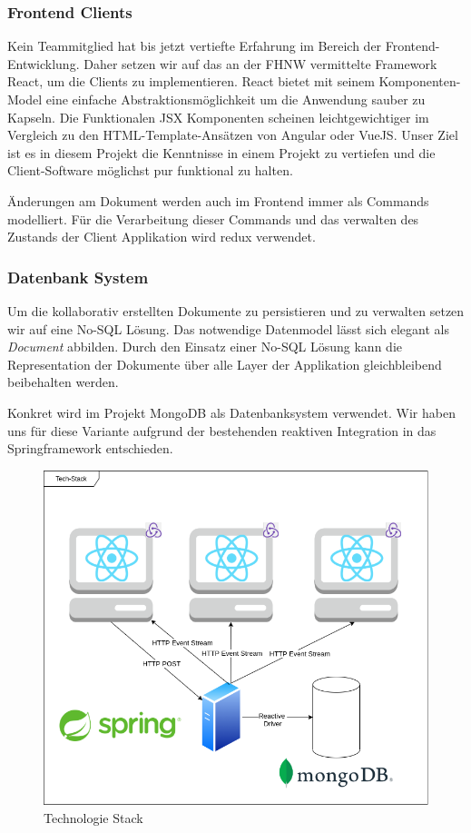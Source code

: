 \subsubsection{Frontend Clients}
Kein Teammitglied hat bis jetzt vertiefte Erfahrung im Bereich der Frontend-Entwicklung.
Daher setzen wir auf das an der FHNW vermittelte Framework React, um die Clients zu implementieren.
React bietet mit seinem Komponenten-Model eine einfache Abstraktionsmöglichkeit um die Anwendung sauber zu Kapseln.
Die Funktionalen JSX Komponenten scheinen leichtgewichtiger im Vergleich zu den HTML-Template-Ansätzen von Angular oder VueJS\@.
Unser Ziel ist es in diesem Projekt die Kenntnisse in einem Projekt zu vertiefen und die Client-Software möglichst pur funktional zu halten.

Änderungen am Dokument werden auch im Frontend immer als Commands modelliert.
Für die Verarbeitung dieser Commands und das verwalten des Zustands der Client Applikation wird redux verwendet.

\subsubsection{Datenbank System}
Um die kollaborativ erstellten Dokumente zu persistieren und zu verwalten setzen wir auf eine No-SQL Lösung.
Das notwendige Datenmodel lässt sich elegant als \emph{Document} abbilden.
Durch den Einsatz einer No-SQL Lösung kann die Representation der Dokumente über alle Layer der Applikation gleichbleibend beibehalten werden\@.

Konkret wird im Projekt MongoDB als Datenbanksystem verwendet.
Wir haben uns für diese Variante aufgrund der bestehenden reaktiven Integration in das Springframework entschieden.

\clearpage

\begin{figure}
    \includegraphics[width=\textwidth,height=\textheight,keepaspectratio]{images/TechStack2.drawio}
    \caption{Technologie Stack}
\end{figure}

